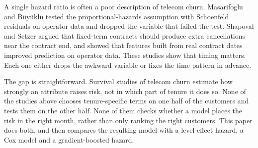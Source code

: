 \documentclass[conference]{IEEEtran}
\begin{document}
A single hazard ratio is often a poor description of telecom churn. Masarifoglu and B\"uy\"ukl\"u \cite{masarifoglu2019} tested the proportional-hazards assumption with Schoenfeld residuals \cite{grambsch1994} on operator data and dropped the variable that failed the test. Shapoval and Setzer \cite{shapoval2015} argued that fixed-term contracts should produce extra cancellations near the contract end, and showed that features built from real contract dates improved prediction on operator data. These studies show that timing matters. Each one either drops the awkward variable or fixes the time pattern in advance.

The gap is straightforward. Survival studies of telecom churn estimate how strongly an attribute raises risk, not in which part of tenure it does so. None of the studies above chooses tenure-specific terms on one half of the customers and tests them on the other half. None of them checks whether a model places the risk in the right month, rather than only ranking the right customers. This paper does both, and then compares the resulting model with a level-effect hazard, a Cox model and a gradient-boosted hazard.
\end{document}
